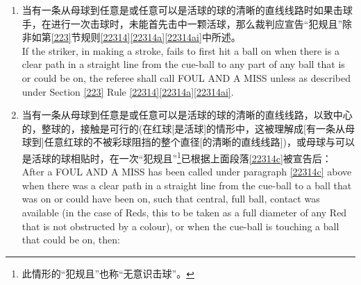 \begin{enumerate}[label=(\alph*)]
    After a FOUL AND A MISS has been called, the non-offender may request the offender to play again from the position left or the original position, in which latter case all balls shall be replaced and the ball on shall be the same as it was prior to the last stroke made, namely:
    \begin{enumerate}[label=(\roman*)]
        \item 任何红球，当红球之前是活球时；\\
        any Red, where Red was the ball on;
        \item 成为活球的彩球，当所有红球之前都离开台面时；或\\
        the colour on, where all the Reds were off the table; or
        \item 一颗依击球手选择的彩球，当活球之前是已被击球入袋的一颗红球之后的，或已被击球入袋的一颗被指定当成红球的自由球之后的，一颗彩球时。\\
        a colour of the striker's choice, where the ball on was a colour after a Red, or a free ball nominated as a Red had been potted.
    \end{enumerate}
    \item \label{22314c}当有一条从母球到任意是或任意可以是活球的球的清晰的直线线路时如果击球手，在进行一次击球时，未能首先击中一颗活球，那么裁判应宣告“犯规且\miss{}”除非如第\ref{223}节规则\ref{22314}\ref{22314a}\ref{22314ai}中所述。\\
    If the striker, in making a stroke, fails to first hit a ball on when there is a clear path in a straight line from the cue-ball to any part of any ball that is or could be on, the referee shall call FOUL AND A MISS unless as described under Section \ref{223} Rule \ref{22314}\ref{22314a}\ref{22314ai}.
    \item \label{22314d}当有一条从母球到任意是或任意可以是活球的球的清晰的直线线路，以致中心的，整球的，接触是可行的(在红球[是活球]的情形中，这被理解成[有一条从母球到]任意红球的不被彩球阻挡的整个直径[的清晰的直线线路])，或母球与可以是活球的球相贴时，在一次“犯规且\miss{}”\footnote{此情形的“犯规且\miss{}”也称“无意识击球”。}已根据上面段落\ref{22314c}被宣告后：\\
    After a FOUL AND A MISS has been called under paragraph \ref{22314c} above when there was a clear path in a straight line from the cue-ball to a ball that was on or could have been on, such that central, full ball, contact was available (in the case of Reds, this to be taken as a full diameter of any Red that is not obstructed by a colour), or when the cue-ball is touching a ball that could be on, then:

\end{enumerate}
